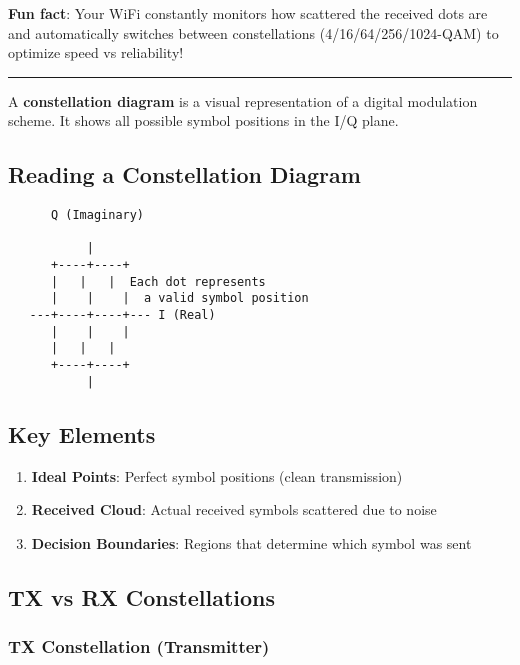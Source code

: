\textbf{Fun fact}: Your WiFi constantly monitors how scattered the
received dots are and automatically switches between constellations
(4/16/64/256/1024-QAM) to optimize speed vs reliability!

\begin{center}\rule{0.5\linewidth}{0.5pt}\end{center}

A \textbf{constellation diagram} is a visual representation of a digital
modulation scheme. It shows all possible symbol positions in the I/Q
plane.

\subsection{Reading a Constellation
Diagram}\label{reading-a-constellation-diagram}

\begin{verbatim}
      Q (Imaginary)
           
           |
      +----+----+
      |   |   |  Each dot represents
      |    |    |  a valid symbol position
   ---+----+----+--- I (Real)
      |    |    |
      |   |   |
      +----+----+
           |
\end{verbatim}

\subsection{Key Elements}\label{key-elements}

\begin{enumerate}
\def\labelenumi{\arabic{enumi}.}
\tightlist
\item
  \textbf{Ideal Points}: Perfect symbol positions (clean transmission)
\item
  \textbf{Received Cloud}: Actual received symbols scattered due to
  noise
\item
  \textbf{Decision Boundaries}: Regions that determine which symbol was
  sent
\end{enumerate}

\subsection{TX vs RX Constellations}\label{tx-vs-rx-constellations}

\subsubsection{TX Constellation
(Transmitter)}\label{tx-constellation-transmitter}

